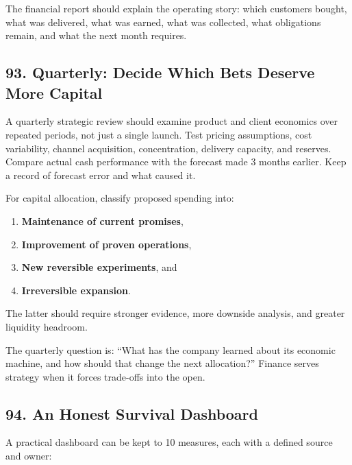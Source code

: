 The financial report should explain the operating story: which customers bought, what was delivered, what was earned, what was collected, what obligations remain, and what the next month requires.

\subsection*{93. Quarterly: Decide Which Bets Deserve More Capital}

A quarterly strategic review should examine product and client economics over repeated periods, not just a single launch. Test pricing assumptions, cost variability, channel acquisition, concentration, delivery capacity, and reserves. Compare actual cash performance with the forecast made 3 months earlier. Keep a record of forecast error and what caused it.

For capital allocation, classify proposed spending into:
\begin{enumerate}
\item \textbf{Maintenance of current promises},
\item \textbf{Improvement of proven operations},
\item \textbf{New reversible experiments}, and
\item \textbf{Irreversible expansion}.
\end{enumerate}
The latter should require stronger evidence, more downside analysis, and greater liquidity headroom.

The quarterly question is: ``What has the company learned about its economic machine, and how should that change the next allocation?'' Finance serves strategy when it forces trade-offs into the open.

\subsection*{94. An Honest Survival Dashboard}

A practical dashboard can be kept to 10 measures, each with a defined source and owner:

